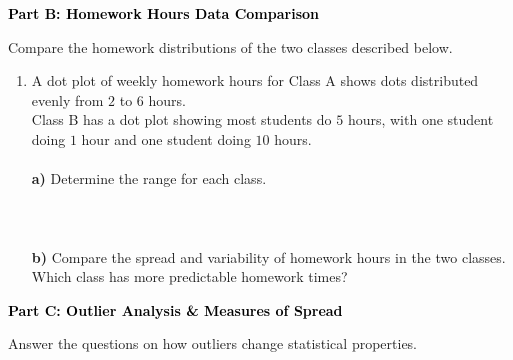 \documentclass[12pt, letterpaper, fleqn]{article}
\begin{document}
\newpage

\begin{tcolorbox}[colback=black!10]
    \large\textcolor{black}{\textbf{Part B: Homework Hours Data Comparison}}
\end{tcolorbox}

\vspace{3mm}

\noindent
Compare the homework distributions of the two classes described below.

\vspace{0.2cm}

\begin{enumerate}[itemsep=2.5cm, leftmargin=0.6cm]
\item A dot plot of weekly homework hours for Class A shows dots distributed evenly from $2$ to $6$ hours. \\ 
Class B has a dot plot showing most students do $5$ hours, with one student doing $1$ hour and one student doing $10$ hours. \\ \\
\textbf{a)} Determine the range for each class. \\ \\
 \\ \\
\textbf{b)} Compare the spread and variability of homework hours in the two classes. Which class has more predictable homework times? \\ 
\vspace{1cm}

\end{enumerate}

\begin{tcolorbox}[colback=black!10]
    \large\textcolor{black}{\textbf{Part C: Outlier Analysis \& Measures of Spread}}
\end{tcolorbox}

\vspace{3mm}

\noindent
Answer the questions on how outliers change statistical properties.

\vspace{0.2cm}
\end{document}

